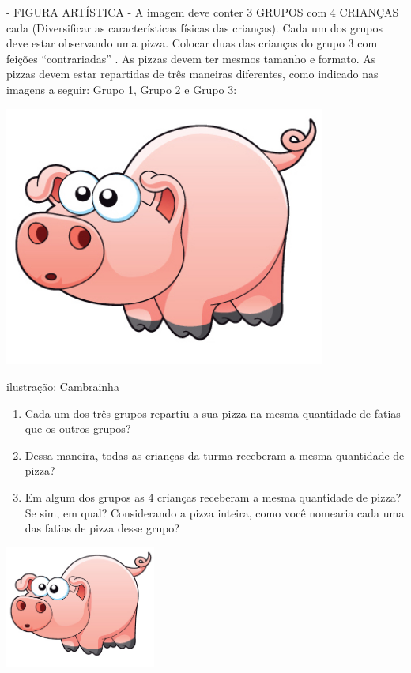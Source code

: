 \documentclass[a4,12pt]{book}
\begin{document}
\begin{imagem*}[breakable]{}{}    - FIGURA ARTÍSTICA - A imagem deve conter 3 GRUPOS com 4 CRIANÇAS cada (Diversificar as características físicas das crianças). Cada um dos grupos deve estar observando uma pizza. Colocar duas das crianças do grupo 3 com feições   ``contrariadas''  . As pizzas devem ter mesmos tamanho e formato. As pizzas devem estar repartidas de três maneiras diferentes, como indicado nas imagens a seguir: Grupo 1, Grupo 2 e Grupo 3:

    \includegraphics[width=300pt, keepaspectratio]{pig}

  ilustração: Cambrainha

\end{imagem*}

\begin{enumerate} [\quad a)] %
  \item     Cada um dos três grupos repartiu a sua pizza na mesma quantidade de fatias que os outros grupos?
  \item     Dessa maneira, todas as crianças da turma receberam a mesma quantidade de pizza?
  \item     Em algum dos grupos as 4 crianças receberam a mesma quantidade de pizza? Se sim, em qual? Considerando a pizza inteira, como você nomearia cada uma das fatias de pizza desse grupo?
\end{enumerate} %







\includegraphics[width=\textwidth,height=4cm, keepaspectratio]{pig}
\end{document}
